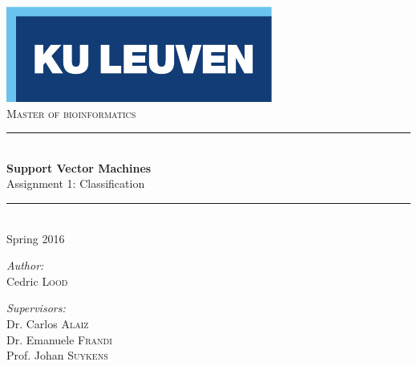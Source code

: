 \begin{titlepage}
  \begin{center}
    
    \includegraphics[scale=1.5]{figures/kuleuven_logo.pdf}~\\[4.5cm]
    \textsc{\Large Master of bioinformatics}\\[0.5cm]

    \rule{\linewidth}{0.3mm}\\[0.4cm]
    {\huge \bfseries Support Vector Machines} \\[0.4cm]
    {\large Assignment 1: Classification} \\[0.4cm]
    \rule{\linewidth}{0.3mm}\\[0.4cm]
    {\large Spring 2016} \\[1.0cm]
    
    \begin{minipage}{0.4\textwidth}
      \begin{flushleft} \large
        \emph{Author:}\\
	Cedric \textsc{Lood}
      \end{flushleft}
    \end{minipage}
    \begin{minipage}{0.4\textwidth}
      \begin{flushright} \large
        \emph{Supervisors:} \\
        Dr. Carlos \textsc{Alaiz}\\
        Dr. Emanuele \textsc{Frandi}\\
        Prof. Johan \textsc{Suykens}\\
        \hfill \newline 
      \end{flushright}
    \end{minipage}
    
    \vfill


\end{center}
\end{titlepage}
